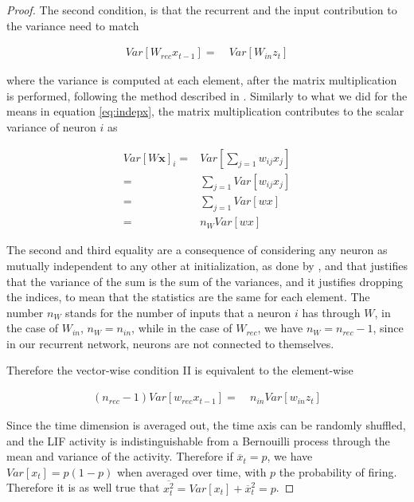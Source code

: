 \begin{proof}
The second condition, is that the recurrent and the input contribution to the variance need to match

\begin{align} %
    Var[W_{rec}x_{t-1}] =&  \ Var[W_{in}z_t]
\end{align}

\noindent where the variance is computed at each element, after the matrix multiplication is performed, following the method described in \cite{glorot2010understanding, he2015delving}. Similarly to what we did for the means in equation \ref{eq:indepx}, the matrix multiplication contributes to the scalar variance of neuron $i$ as

\begin{align}\label{eq:indepxvar}
    Var[W\boldsymbol{x}]_i=&Var[\sum_{j=1} w_{ij}x_j] \\
    =& \sum_{j=1} Var[ w_{ij}x_j] \\
    =& \sum_{j=1} Var[ wx]  \\
    =& n_W Var[ wx]
\end{align}

The second and third equality are a consequence of considering any neuron as mutually independent to any other at initialization, as done by \cite{glorot2010understanding, he2015delving}, and that justifies that the variance of the sum is the sum of the variances, and it justifies dropping the indices, to mean that the statistics are the same for each element. The number $n_W$ stands for the number of inputs that a neuron $i$ has through $W$, in the case of $W_{in}$, $n_W=n_{in}$, while in the case of $W_{rec}$, we have $n_W=n_{rec}-1$, since in our recurrent network, neurons are not connected to themselves.

Therefore the vector-wise condition II is equivalent to the element-wise


\begin{align}
    (n_{rec}-1)Var[w_{rec}x_{t-1}] =& \  n_{in}Var[w_{in}z_t]
\end{align}

Since the time dimension is averaged out, the time axis can be randomly shuffled, and the LIF activity is indistinguishable from a Bernouilli process through the mean and variance of the activity. Therefore if $\overline{x}_t=p$, we have $Var[x_t]=p(1-p)$ when averaged over time, with $p$ the probability of firing. Therefore it is as well true that $\overline{x_t^2}=Var[x_t] + \overline{x}_t^2 =p$.


\end{proof}
